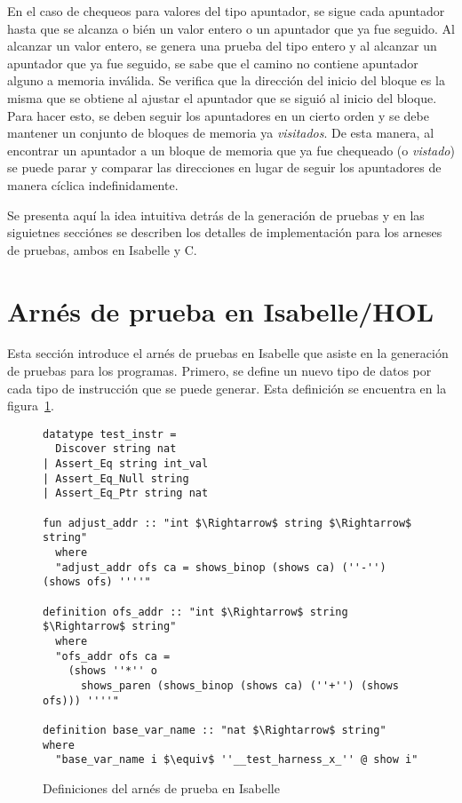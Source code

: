 En el caso de chequeos para valores del tipo apuntador, se sigue cada apuntador hasta que se alcanza o bién un valor entero o un apuntador que ya fue seguido.
Al alcanzar un valor entero, se genera una prueba del tipo entero y al alcanzar un apuntador que ya fue seguido, se sabe que el camino no contiene apuntador alguno a memoria inválida.
Se verifica que la dirección del inicio del bloque es la misma que se obtiene al ajustar el apuntador que se siguió al inicio del bloque.
Para hacer esto, se deben seguir los apuntadores en un cierto orden y se debe mantener un conjunto de bloques de memoria ya \textit{visitados}.
De esta manera, al encontrar un apuntador a un bloque de memoria que ya fue chequeado (o \textit{vistado}) se puede parar y comparar las direcciones en lugar de seguir los apuntadores de manera cíclica indefinidamente.

Se presenta aquí la idea intuitiva detrás de la generación de pruebas y en las siguietnes secciónes se describen los detalles de implementación para los arneses de pruebas, ambos en Isabelle y C.

\section{Arnés de prueba en Isabelle/HOL}

Esta sección introduce el arnés de pruebas en Isabelle que asiste en la generación de pruebas para los programas.
Primero, se define un nuevo tipo de datos por cada tipo de instrucción que se puede generar.
Esta definición se encuentra en la figura~\ref{fig:test_harness_datatype}.


\begin{figure}
\begin{lstlisting}[mathescape=true]
datatype test_instr =
  Discover string nat
| Assert_Eq string int_val
| Assert_Eq_Null string
| Assert_Eq_Ptr string nat

fun adjust_addr :: "int $\Rightarrow$ string $\Rightarrow$ string"
  where
  "adjust_addr ofs ca = shows_binop (shows ca) (''-'') (shows ofs) ''''"

definition ofs_addr :: "int $\Rightarrow$ string $\Rightarrow$ string"
  where
  "ofs_addr ofs ca =
    (shows ''*'' o
      shows_paren (shows_binop (shows ca) (''+'') (shows ofs))) ''''"

definition base_var_name :: "nat $\Rightarrow$ string" where
  "base_var_name i $\equiv$ ''__test_harness_x_'' @ show i"
\end{lstlisting}

\caption{Definiciones del arnés de prueba en Isabelle}
\label{fig:test_harness_datatype}
\end{figure}

